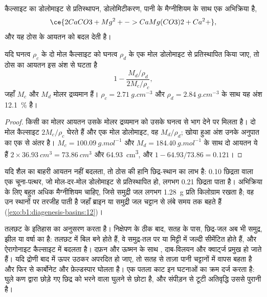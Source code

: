 कैल्साइट का डोलोमाइट से प्रतिस्थापन, डोलोमिटीकरण, पानी के मैग्नीशियम के साथ एक अभिक्रिया है,
\[
  \ce{2 CaCO3 + Mg^2+ -> CaMg(CO3)2 + Ca^2+},
\]
और यह ठोस के आयतन को बदल देती है।

\begin{proposition}[डोलोमिटीकरण छिद्रता बनाता है]\label{prop:b1:diagenesis-basins:dolomite}
यदि घनत्व $\rho_c$ के दो मोल कैल्साइट को घनत्व $\rho_d$ के एक मोल डोलोमाइट से प्रतिस्थापित किया जाए, तो ठोस का आयतन इस अंश से घटता है
\[
  1 - \frac{M_d/\rho_d}{2M_c/\rho_c},
\]
जहाँ $M_c$ और $M_d$ मोलर द्रव्यमान हैं। $\rho_c = \qty{2.71}{g.cm^{-3}}$ और
$\rho_d = \qty{2.84}{g.cm^{-3}}$ के साथ यह अंश \qty{12.1}{\percent} है।
\end{proposition}

\begin{proof}
किसी  का मोलर आयतन उसके मोलर द्रव्यमान को उसके घनत्व से भाग देने पर मिलता है। दो मोल कैल्साइट $2M_c/\rho_c$ घेरते हैं और एक मोल डोलोमाइट, वह $M_d/\rho_d$; खोया हुआ अंश उनके अनुपात का एक से अंतर है।
$M_c = \qty{100.09}{g.mol^{-1}}$ और $M_d = \qty{184.40}{g.mol^{-1}}$ के साथ दो आयतन ये हैं
$2\times\qty{36.93}{cm^3} = \qty{73.86}{cm^3}$ और \qty{64.93}{cm^3}, और
$1 - 64.93/73.86 = \num{0.121}$।
\end{proof}

यदि शैल का बाहरी आयतन नहीं बदलता, तो ठोस की हानि छिद्र-स्थान का लाभ है: \num{0.10} छिद्रता वाला एक चूना-पत्थर, जो मोल-दर-मोल डोलोमाइट से प्रतिस्थापित हो, लगभग \num{0.21} छिद्रता पाता है। अभिक्रिया के लिए बहुत अधिक मैग्नीशियम चाहिए, जिसे समुद्री जल लगभग \qty{1.28}{g} प्रति किलोग्राम रखता है; वह उन स्थानों पर तरजीह पाती है जहाँ ब्राइन या समुद्री जल चट्टान से लंबे समय तक बहते हैं (\cref{exo:b1:diagenesis-basins:12})।

 तलछट के इतिहास का अनुसरण करता है। निक्षेपण के ठीक बाद, सतह के पास, छिद्र-जल अब भी समुद्र, झील या वर्षा का है: तलछट में बिल बने होते हैं, वे समुद्र-तल पर या मिट्टी में जल्दी सीमेंटित होते हैं, और ऐरागोनाइट कैल्साइट में बदलता है। दफ़न और ऊष्मन के साथ , दाब-विलयन और क्वार्ट्ज  प्रमुख हो जाते हैं। यदि द्रोणी बाद में ऊपर उठकर अपरदित हो जाए, तो सतह से ताज़ा पानी चट्टानों में वापस बहता है और फिर से कार्बोनेट और फ़ेल्डस्पार घोलता है। एक पतला काट इन घटनाओं का क्रम दर्ज करता है: घुले कण द्वारा छोड़े गए छिद्र को भरने वाला  घुलने से छोटा है, और संपीड़न से टूटी अतिवृद्धि उससे पुरानी है।

